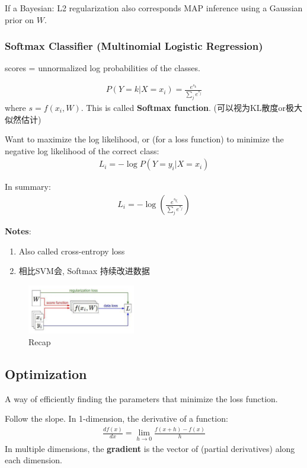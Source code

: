 If a Bayesian: L2 regularization also corresponds MAP inference using a Gaussian prior on $W$. 

\subsubsection{Softmax Classifier (Multinomial Logistic Regression)}
scores = unnormalized log probabilities of the classes.

\begin{align*}
    P(Y=k|X=x_i)=\frac{e^{s_k}}{\sum_j e^{s_j}}
\end{align*}
where $s=f(x_i, W)$. This is called \textbf{Softmax function}. (可以视为KL散度or极大似然估计)

Want to maximize the log likelihood, or (for a loss function) to minimize the negative log likelihood of the correct class:
\begin{align*}
    L_i=-\log P(Y=y_i|X=x_i)
\end{align*}

In summary:
\begin{align*}
    L_i=-\log\left(  \frac{e^{s_{y_i}}}{\sum_j e^{s_j}}\right)
\end{align*}

\textbf{Notes}:
\begin{enumerate}\small
    \item  Also called cross-entropy loss
    \item 相比SVM会, Softmax 持续改进数据
\end{enumerate}

\begin{figure}[!htb]
    \centering
    \includegraphics[width=0.42\textwidth]{pic/Lec3/Recap.png}
    \caption{Recap}
\end{figure}

\subsection{Optimization}
A way of efficiently finding the parameters that minimize the loss function.

Follow the slope. In 1-dimension, the derivative of a function:
\begin{align*}
    \frac{df(x)}{dx}=\lim_{h\rightarrow 0}\frac{f(x+h)-f(x)}{h}
\end{align*}
In multiple dimensions, the \textbf{gradient} is the vector of (partial derivatives) along each dimension. 

